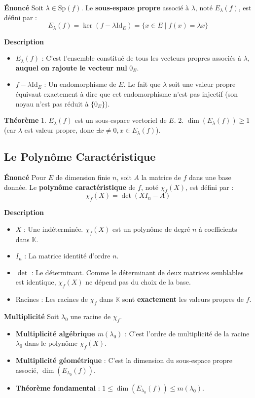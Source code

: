 \documentclass[11pt,a4paper]{article}
\begin{document}
\textbf{Énoncé}
Soit $\lambda \in \text{Sp}(f)$. Le \textbf{sous-espace propre} associé à $\lambda$, noté $E_\lambda(f)$, est défini par :
$$E_\lambda(f) = \ker(f - \lambda \text{Id}_E) = \{x \in E \mid f(x) = \lambda x\}$$

\textbf{Description}
\begin{itemize}
\item $E_\lambda(f)$ : C'est l'ensemble constitué de tous les vecteurs propres associés à $\lambda$, \textbf{auquel on rajoute le vecteur nul} $0_E$.
\item $f - \lambda \text{Id}_E$ : Un endomorphisme de $E$. Le fait que $\lambda$ soit une valeur propre équivaut exactement à dire que cet endomorphisme n'est pas injectif (son noyau n'est pas réduit à $\{0_E\}$).
\end{itemize}
\textbf{Théorème}
1. $E_\lambda(f)$ est un sous-espace vectoriel de $E$.
2. $\dim(E_\lambda(f)) \geq 1$ (car $\lambda$ est valeur propre, donc $\exists x \neq 0, x \in E_\lambda(f)$).

\subsection{Le Polynôme Caractéristique}

\textbf{Énoncé}
Pour $E$ de dimension finie $n$, soit $A$ la matrice de $f$ dans une base donnée. Le \textbf{polynôme caractéristique} de $f$, noté $\chi_f(X)$, est défini par :
$$\chi_f(X) = \det(X I_n - A)$$

\textbf{Description}
\begin{itemize}
\item $X$ : Une indéterminée. $\chi_f(X)$ est un polynôme de degré $n$ à coefficients dans $\mathbb{K}$.
\item $I_n$ : La matrice identité d'ordre $n$.
\item $\det$ : Le déterminant. Comme le déterminant de deux matrices semblables est identique, $\chi_f(X)$ ne dépend pas du choix de la base.
\item Racines : Les racines de $\chi_f$ dans $\mathbb{K}$ sont \textbf{exactement} les valeurs propres de $f$.
\end{itemize}
\textbf{Multiplicité}
Soit $\lambda_0$ une racine de $\chi_f$.
\begin{itemize}
\item \textbf{Multiplicité algébrique $m(\lambda_0)$} : C'est l'ordre de multiplicité de la racine $\lambda_0$ dans le polynôme $\chi_f(X)$.
\item \textbf{Multiplicité géométrique} : C'est la dimension du sous-espace propre associé, $\dim(E_{\lambda_0}(f))$.
\item \textbf{Théorème fondamental} : $1 \leq \dim(E_{\lambda_0}(f)) \leq m(\lambda_0)$.
\end{itemize}
\end{document}
